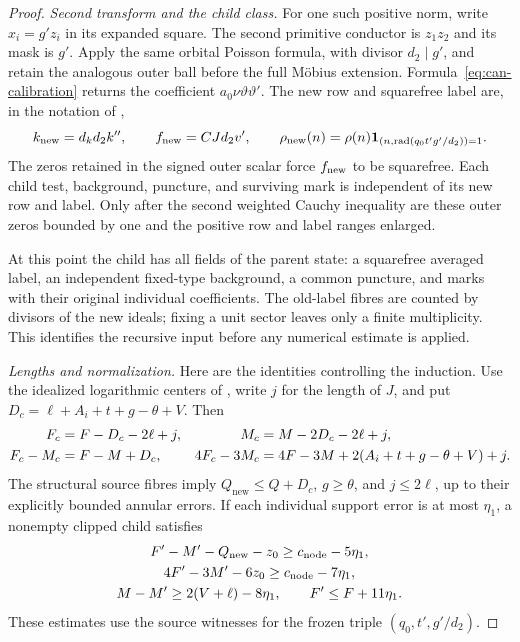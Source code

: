 \documentclass[11pt,a4paper]{article}
\numberwithin{equation}{section}
\theoremstyle{definition}
\theoremstyle{remark}
\newcommand{\rad}{\operatorname{rad}}
\begin{document}
\begin{proof}
\smallskip\noindent\emph{Second transform and the child class.}
For one such positive norm, write $x_i=g'z_i$ in its expanded
square.  The second primitive conductor is $z_1z_2$ and its mask
is $g'$.  Apply the same orbital Poisson formula, with divisor
$d_2\mid g'$, and retain the analogous outer ball before the full
Möbius extension.  Formula~\eqref{eq:can-calibration} returns the
coefficient $a_0\nu\vartheta\vartheta'$.
The new row and squarefree label are, in the notation of
\cite[(17.42)--(17.55)]{Q},
\[
 k_{\rm new}=d_kd_2k'',\qquad f_{\rm new}=CJd_2v',\qquad
 \rho_{\rm new}(n)=\rho(n)
            \mathbf1_{(n,\rad(q_0t'g'/d_2))=1}.
\]
The zeros retained in the signed outer scalar force
$f_{\rm new}$ to be squarefree.  Each child test, background,
puncture, and surviving mark is independent of its new row and label.
Only after the second weighted Cauchy inequality are these outer
zeros bounded by one and the positive row and label ranges enlarged.

At this point the child has all fields of the parent state: a
squarefree averaged label, an independent fixed-type background, a
common puncture, and marks with their original individual coefficients.
The old-label fibres are counted by divisors of the new ideals; fixing
a unit sector leaves only a finite multiplicity. This identifies the
recursive input before any numerical estimate is applied.

\smallskip\noindent\emph{Lengths and normalization.}
Here are the identities controlling the induction.
Use the idealized logarithmic centers of \cite[(17.45)--(17.48)]{Q},
write $j$ for the length of $J$, and put
$D_c=\ell+A_i+t+g-\theta+V$.
Then
\begin{align}\label{eq:can-child-identities}
 F_c&=F-D_c-2\ell+j,& M_c&=M-2D_c-2\ell+j,\notag\\
 F_c-M_c&=F-M+D_c,&
 4F_c-3M_c&=4F-3M+2(A_i+t+g-\theta+V)+j.
\end{align}
The structural source fibres imply
$Q_{\mathrm{new}}\le Q+D_c$, $g\ge\theta$, and $j\le2\ell$,
up to their explicitly bounded annular errors.
If each individual support error is at most $\eta_1$, a nonempty
clipped child satisfies
\begin{equation}\label{eq:can-child-margins}
 \begin{gathered}
 F'-M'-Q_{\mathrm{new}}-z_0\ge c_{\rm node}-5\eta_1,\\
 4F'-3M'-6z_0\ge c_{\rm node}-7\eta_1,\\
 M-M'\ge2(V+\ell)-8\eta_1,\qquad F'\le F+11\eta_1.
 \end{gathered}
\end{equation}
These estimates use the source witnesses for the frozen triple
$(q_0,t',g'/d_2)$.


\end{proof}
\end{document}
